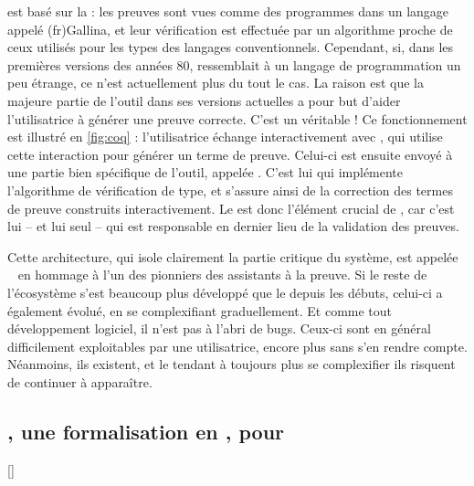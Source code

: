  est basé sur la  : les preuves sont vues comme des programmes dans un langage appelé \intro(fr){Gallina},
et leur vérification est effectuée par un algorithme proche
de ceux utilisés pour les types des langages conventionnels.
Cependant, si, dans les premières versions des années 80,  ressemblait à un langage de programmation un peu étrange, ce n’est actuellement plus du tout le cas.
La raison est que la majeure partie de l’outil dans ses versions actuelles a
pour but d’aider l’utilisatrice à générer une preuve correcte. C’est un véritable
 !
Ce fonctionnement est illustré en \cref{fig:coq} : l’utilisatrice échange interactivement avec , qui utilise cette interaction pour générer un terme de preuve. Celui-ci est ensuite envoyé à une partie bien spécifique de l’outil, appelée .
C’est lui qui implémente l’algorithme de vérification de type, et s’assure ainsi de la correction des termes de preuve construits interactivement.
Le  est donc l’élément crucial de , car c’est lui – et lui seul – qui est responsable en dernier lieu de la validation des preuves.

Cette architecture, qui isole clairement la partie critique du système,
est appelée ~ en 
hommage à l’un des pionniers des assistants à la preuve.
Si le reste de l’écosystème s’est beaucoup plus développé que le  depuis les débuts, celui-ci a également évolué, en se complexifiant graduellement.
Et comme tout développement logiciel, il n’est pas à l’abri de bugs.
Ceux-ci sont en général difficilement exploitables par une utilisatrice,
encore plus sans s’en rendre compte.
Néanmoins, ils existent,
et le  tendant à toujours plus se complexifier
ils risquent de continuer à apparaître.

\subsection{, une formalisation en , pour }[]
\label{sec:intro-metacoq}


